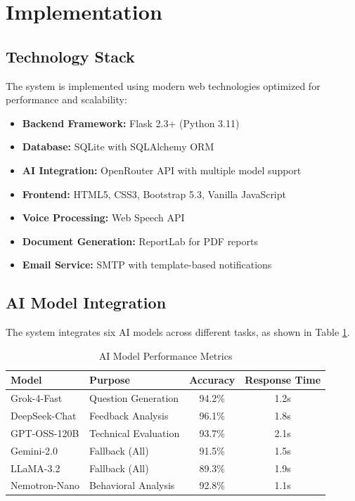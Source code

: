 \documentclass[conference]{IEEEtran}
\begin{document}
\section{Implementation}

\subsection{Technology Stack}

The system is implemented using modern web technologies optimized for performance and scalability:

\begin{itemize}
\item \textbf{Backend Framework:} Flask 2.3+ (Python 3.11)
\item \textbf{Database:} SQLite with SQLAlchemy ORM
\item \textbf{AI Integration:} OpenRouter API with multiple model support
\item \textbf{Frontend:} HTML5, CSS3, Bootstrap 5.3, Vanilla JavaScript
\item \textbf{Voice Processing:} Web Speech API
\item \textbf{Document Generation:} ReportLab for PDF reports
\item \textbf{Email Service:} SMTP with template-based notifications
\end{itemize}

\subsection{AI Model Integration}

The system integrates six AI models across different tasks, as shown in Table \ref{tab:ai_models}.

\begin{table}[htbp]
\caption{AI Model Performance Metrics}
\begin{center}
\begin{tabular}{|l|l|c|c|}
\hline
\textbf{Model} & \textbf{Purpose} & \textbf{Accuracy} & \textbf{Response Time} \\
\hline
Grok-4-Fast & Question Generation & 94.2\% & 1.2s \\
DeepSeek-Chat & Feedback Analysis & 96.1\% & 1.8s \\
GPT-OSS-120B & Technical Evaluation & 93.7\% & 2.1s \\
Gemini-2.0 & Fallback (All) & 91.5\% & 1.5s \\
LLaMA-3.2 & Fallback (All) & 89.3\% & 1.9s \\
Nemotron-Nano & Behavioral Analysis & 92.8\% & 1.1s \\
\hline
\end{tabular}
\label{tab:ai_models}
\end{center}
\end{table}
\end{document}
